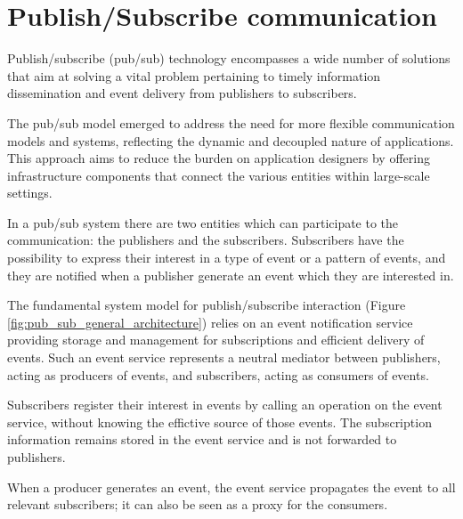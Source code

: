

\chapter{Publish/Subscribe communication}

Publish/subscribe (pub/sub) technology encompasses a wide number of solutions
that aim at solving a vital problem pertaining to timely information
dissemination and event delivery from publishers to subscribers.
\cite{Pub/Sub_pattern}

The pub/sub model emerged to address the need for more flexible communication
models and systems, reflecting the dynamic and decoupled nature of
applications.
This approach aims to reduce the burden on application designers by offering
infrastructure components that connect the various entities within large-scale
settings. \cite{Many_faces_of_pub/sub}

In a pub/sub system there are two entities which can participate to the
communication: the publishers and the subscribers.
Subscribers have the possibility to express their interest in a type of event
or a pattern of events, and they are notified when a publisher generate an event
which they are interested in.

The fundamental system model for publish/subscribe interaction (Figure 
\ref{fig:pub_sub_general_architecture}) relies on an event notification service
providing storage and management for subscriptions and efficient delivery of
events. Such an event service represents a neutral mediator between publishers,
acting as producers of events, and subscribers, acting as consumers of events.

Subscribers register their interest in events by calling an operation on the
event service, without knowing the effictive source of those events.
The subscription information remains stored in the event service and is not
forwarded to publishers.

When a producer generates an event, the event service propagates the event to
all relevant subscribers; it can also be seen as a proxy for the consumers.

